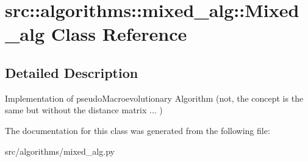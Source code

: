 \hypertarget{classsrc_1_1algorithms_1_1mixed__alg_1_1Mixed__alg}{
\section{src::algorithms::mixed\_\-alg::Mixed\_\-alg Class Reference}
\label{classsrc_1_1algorithms_1_1mixed__alg_1_1Mixed__alg}
}


\subsection{Detailed Description}
\begin{DoxyVerb}
  Implementation of pseudoMacroevolutionary Algorithm
  (not, the concept is the same but without the distance matrix ... )
  \end{DoxyVerb}
 

The documentation for this class was generated from the following file:\begin{DoxyCompactItemize}
\item 
src/algorithms/mixed\_\-alg.py\end{DoxyCompactItemize}
